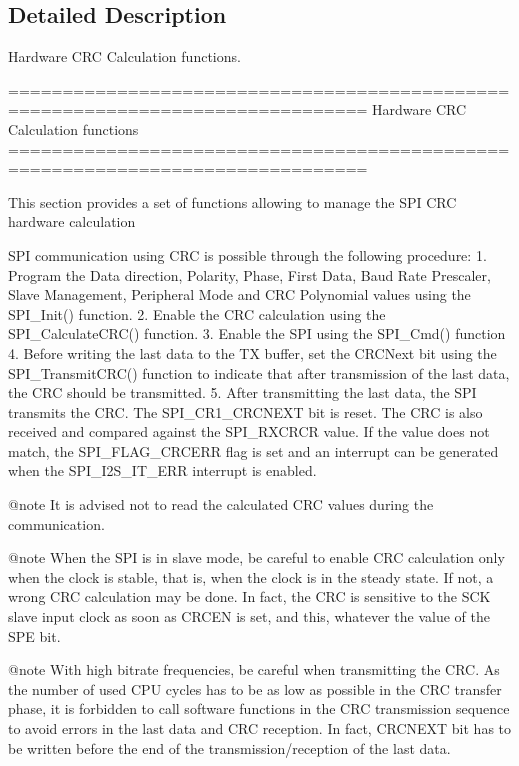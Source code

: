 \subsection{Detailed Description}
Hardware C\-R\-C Calculation functions. \begin{DoxyVerb} ===============================================================================
                         Hardware CRC Calculation functions
 ===============================================================================  

  This section provides a set of functions allowing to manage the SPI CRC hardware 
  calculation

  SPI communication using CRC is possible through the following procedure:
     1. Program the Data direction, Polarity, Phase, First Data, Baud Rate Prescaler, 
        Slave Management, Peripheral Mode and CRC Polynomial values using the SPI_Init()
        function.
     2. Enable the CRC calculation using the SPI_CalculateCRC() function.
     3. Enable the SPI using the SPI_Cmd() function
     4. Before writing the last data to the TX buffer, set the CRCNext bit using the 
      SPI_TransmitCRC() function to indicate that after transmission of the last 
      data, the CRC should be transmitted.
     5. After transmitting the last data, the SPI transmits the CRC. The SPI_CR1_CRCNEXT
        bit is reset. The CRC is also received and compared against the SPI_RXCRCR 
        value. 
        If the value does not match, the SPI_FLAG_CRCERR flag is set and an interrupt
        can be generated when the SPI_I2S_IT_ERR interrupt is enabled.

@note It is advised not to read the calculated CRC values during the communication.

@note When the SPI is in slave mode, be careful to enable CRC calculation only 
      when the clock is stable, that is, when the clock is in the steady state. 
      If not, a wrong CRC calculation may be done. In fact, the CRC is sensitive 
      to the SCK slave input clock as soon as CRCEN is set, and this, whatever 
      the value of the SPE bit.

@note With high bitrate frequencies, be careful when transmitting the CRC.
      As the number of used CPU cycles has to be as low as possible in the CRC 
      transfer phase, it is forbidden to call software functions in the CRC 
      transmission sequence to avoid errors in the last data and CRC reception. 
      In fact, CRCNEXT bit has to be written before the end of the transmission/reception 
      of the last data.


\end{DoxyVerb}
